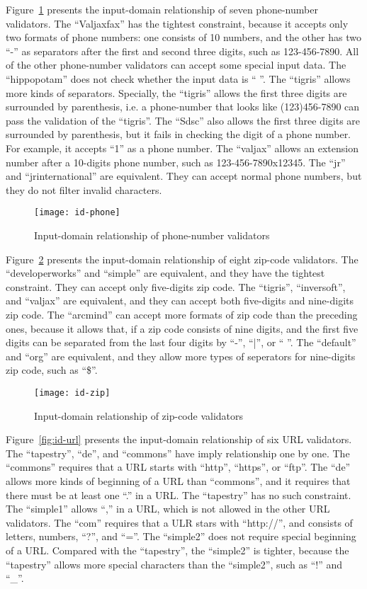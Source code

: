 Figure~\ref{fig:id-phone} presents the input-domain relationship of seven phone-number validators.
The ``Valjaxfax'' has the tightest constraint, because it accepts only two formats of phone numbers: one consists of 10 numbers, and the other has two ``-'' as separators after the first and second three digits, such as 123-456-7890. All of the other phone-number validators can accept some special input data. The ``hippopotam'' does not check whether the input data is `` ''. The ``tigris'' allows more kinds of separators. Specially, the ``tigris'' allows the first three digits are surrounded by parenthesis, i.e. a phone-number that looks like (123)456-7890 can pass the validation of the ``tigris''. The ``Sdsc'' also allows the first three digits are surrounded by parenthesis, but it fails in checking the digit of a phone number. For example, it accepts ``1'' as a phone number. The ``valjax'' allows an extension number after a 10-digits phone number, such as 123-456-7890x12345. The ``jr'' and ``jrinternational'' are equivalent. They can accept normal phone numbers, but they do not filter invalid characters.

\begin{figure}
\centering
\texttt{[image: id-phone]}
\caption{Input-domain relationship of phone-number validators}  
\label{fig:id-phone}
\end{figure}

Figure~\ref{fig:id-zip} presents the input-domain relationship of eight zip-code validators.
The ``developerworks'' and ``simple'' are equivalent, and they have the tightest constraint. They can accept only five-digits zip code.  The ``tigris'', ``inversoft'', and ``valjax'' are equivalent, and they can accept both five-digits and nine-digits zip code. The ``arcmind'' can accept more formats of zip code than the preceding ones, because it allows that, if a zip code consists of nine digits, and the first five digits can be separated from the last four digits by ``-'', ``|'', or `` ''. The ``default'' and ``org'' are equivalent, and they allow more types of seperators for nine-digits zip code, such as ``\$''.

\begin{figure}
\centering
\texttt{[image: id-zip]}
\caption{Input-domain relationship of zip-code validators}  
\label{fig:id-zip}
\end{figure}

Figure~\ref{fig:id-url} presents the input-domain relationship of six URL validators.
The ``tapestry'', ``de'', and ``commons'' have imply relationship one by one. The ``commons'' requires that a URL starts with ``http'', ``https'', or ``ftp''. The ``de'' allows more kinds of beginning of a URL than ``commons'', and it requires that there must be at least one ``.'' in a URL. The ``tapestry'' has no such constraint. The ``simple1'' allows ``,'' in a URL, which is not allowed in the other URL validators. The ``com'' requires that a ULR stars with ``http://'', and consists of letters, numbers, ``?'', and ``=''. The ``simple2'' does not require special beginning of a URL. Compared with the ``tapestry'', the ``simple2'' is tighter, because the ``tapestry'' allows more special characters than the ``simple2'', such as ``!'' and ``\_''.

